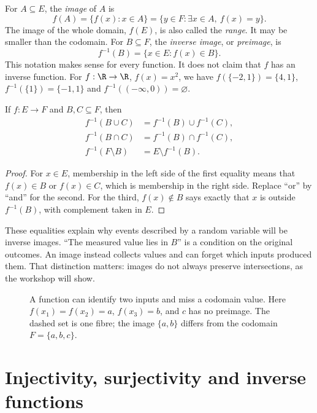 For $A\subseteq E$, the \emph{image} of $A$ is
\[
f(A)=\{f(x):x\in A\}
=\{y\in F:\exists x\in A,\ f(x)=y\}.
\]
The image of the whole domain, $f(E)$, is also called the \emph{range}. It may be
smaller than the codomain. For $B\subseteq F$, the \emph{inverse image}, or
\emph{preimage}, is
\[
f^{-1}(B)=\{x\in E:f(x)\in B\}.
\]
This notation makes sense for every function. It does not claim that $f$ has an
inverse function. For $f:\R\to\R$, $f(x)=x^2$, we have
$f(\{-2,1\})=\{4,1\}$, $f^{-1}(\{1\})=\{-1,1\}$ and
$f^{-1}((-\infty,0))=\varnothing$.

\begin{proposition}\label{prop:lang-preimages}
If $f:E\to F$ and $B,C\subseteq F$, then
\[
\begin{aligned}
f^{-1}(B\cup C)&=f^{-1}(B)\cup f^{-1}(C),\\
f^{-1}(B\cap C)&=f^{-1}(B)\cap f^{-1}(C),\\
f^{-1}(F\setminus B)&=E\setminus f^{-1}(B).
\end{aligned}
\]
\end{proposition}
\begin{proof}
For $x\in E$, membership in the left side of the first equality means that
$f(x)\in B$ or $f(x)\in C$, which is membership in the right side. Replace ``or''
by ``and'' for the second. For the third, $f(x)\notin B$ says exactly that $x$
is outside $f^{-1}(B)$, with complement taken in $E$.
\end{proof}

These equalities explain why events described by a random variable will be inverse
images. ``The measured value lies in $B$'' is a condition on the original outcomes.
An image instead collects values and can forget which inputs produced them.
That distinction matters: images do not always preserve intersections, as the workshop will show.

\begin{figure}[ht]
\centering
{}
\caption{A function can identify two inputs and miss a codomain value. Here
$f(x_1)=f(x_2)=a$, $f(x_3)=b$, and $c$ has no preimage. The dashed set is
one fibre; the image $\{a,b\}$ differs from the codomain $F=\{a,b,c\}$.}
\label{fig:language-fibres}
\end{figure}

\section{Injectivity, surjectivity and inverse functions}

